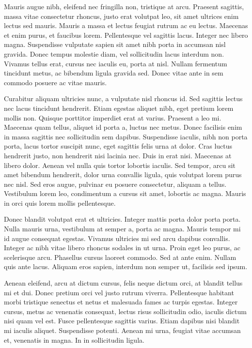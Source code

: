 Mauris augue nibh, eleifend nec fringilla non, tristique at arcu.
Praesent sagittis, massa vitae consectetur rhoncus, justo erat volutpat
leo, sit amet ultrices enim lectus sed mauris. Mauris a massa et lectus
feugiat rutrum ac eu lectus. Maecenas et enim purus, et faucibus lorem.
Pellentesque vel sagittis lacus. Integer nec libero magna. Suspendisse
vulputate sapien sit amet nibh porta in accumsan nisl gravida. Donec
tempus molestie diam, vel sollicitudin lacus interdum non. Vivamus
tellus erat, cursus nec iaculis eu, porta at nisl. Nullam fermentum
tincidunt metus, ac bibendum ligula gravida sed. Donec vitae ante
in sem commodo posuere ac vitae mauris.

Curabitur aliquam ultricies nunc, a vulputate nisl rhoncus id. Sed
sagittis lectus nec lacus tincidunt hendrerit. Etiam egestas aliquet
nibh, eget pretium lorem mollis non. Quisque porttitor imperdiet erat
at varius. Praesent a leo mi. Maecenas quam tellus, aliquet id porta
a, luctus nec metus. Donec facilisis enim in massa sagittis nec sollicitudin
sem dapibus. Suspendisse iaculis, nibh non porta porta, lacus tortor
suscipit nunc, eget sagittis felis urna at dolor. Cras luctus hendrerit
justo, non hendrerit nisi lacinia nec. Duis in erat nisi. Maecenas
at libero dolor. Aenean vel nulla quis tortor lobortis iaculis. Sed
tempor, arcu sit amet bibendum hendrerit, dolor urna convallis ligula,
quis volutpat lorem purus nec nisl. Sed eros augue, pulvinar eu posuere
consectetur, aliquam a tellus. Vestibulum lorem leo, condimentum a
cursus sit amet, lobortis ac magna. Mauris in orci quis lorem mollis
pellentesque.

Donec blandit volutpat erat et ultricies. Integer mattis porta dolor
porta porta. Nulla mauris urna, vestibulum at semper a, porta ac magna.
Mauris tempor mi id augue consequat egestas. Vivamus ultricies mi
sed arcu dapibus convallis. Integer ac nibh vitae libero rhoncus sodales
in ut urna. Proin eget leo purus, ac scelerisque arcu. Phasellus cursus
laoreet commodo. Sed at ante enim. Nullam quis ante lacus. Aliquam
eros sapien, interdum non semper ut, facilisis sed ipsum.

Aenean eleifend, arcu at dictum cursus, felis neque dictum orci, at
blandit tellus mi et dui. Donec pretium orci vel justo rutrum viverra.
Pellentesque habitant morbi tristique senectus et netus et malesuada
fames ac turpis egestas. Integer cursus, metus ac venenatis consequat,
lectus risus sollicitudin odio, iaculis dictum nisi quam vel est.
Fusce pellentesque sagittis varius. Etiam dapibus nisi blandit mi
iaculis aliquet. Suspendisse potenti. Aenean mi urna, feugiat vitae
accumsan et, venenatis in magna. In in sollicitudin ligula.

